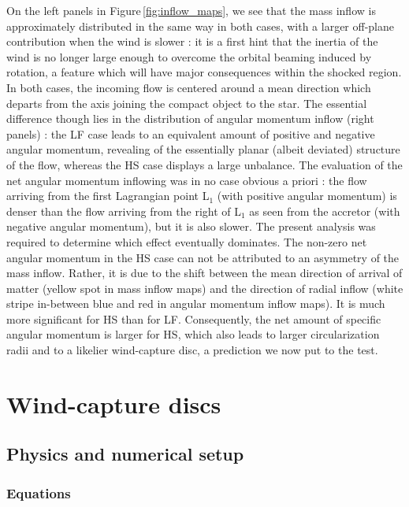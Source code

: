 \documentclass{aa}
\begin{document}
On the left panels in Figure\,\ref{fig:inflow_maps}, we see that the mass inflow is approximately distributed in the same way in both cases, with a larger off-plane contribution when the wind is slower : it is a first hint that the inertia of the wind is no longer large enough to overcome the orbital beaming induced by rotation, a feature which will have major consequences within the shocked region. In both cases, the incoming flow is centered around a mean direction which departs from the axis joining the compact object to the star. The essential difference though lies in the distribution of angular momentum inflow (right panels) : the LF case leads to an equivalent amount of positive and negative angular momentum, revealing of the essentially planar (albeit deviated) structure of the flow, whereas the HS case displays a large unbalance. The evaluation of the net angular momentum inflowing was in no case obvious a priori : the flow arriving from the first Lagrangian point L$_1$ (with positive angular momentum) is denser than the flow arriving from the right of L$_1$ as seen from the accretor (with negative angular momentum), but it is also slower. The present analysis was required to determine which effect eventually dominates. The non-zero net angular momentum in the HS case can not be attributed to an asymmetry of the mass inflow. Rather, it is due to the shift between the mean direction of arrival of matter (yellow spot in mass inflow maps) and the direction of radial inflow (white stripe in-between blue and red in angular momentum inflow maps). It is much more significant for HS than for LF. Consequently, the net amount of specific angular momentum is larger for HS, which also leads to larger circularization radii and to a likelier wind-capture disc, a prediction we now put to the test.

\section{Wind-capture discs}
\label{sec:wind-capt_discs}

\subsection{Physics and numerical setup}
\label{sec:HD}

\subsubsection{Equations}
\label{sec:HD_eq}
\end{document}
